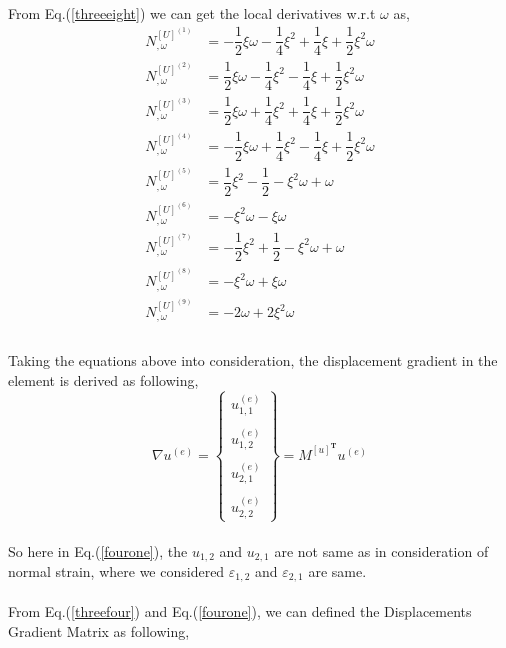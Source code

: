 \documentclass[12pt]{article}
\begin{document}
\\
From Eq.(\ref{threeeight}) we can get the local derivatives w.r.t  $\omega$ as,
\begin{equation}\label{fourty}
\begin{aligned}
N_{,\omega}^{[U]^{(1)}} &= -\dfrac{1}{2}\xi\omega-\dfrac{1}{4}\xi^2+\dfrac{1}{4}\xi+\dfrac{1}{2}\xi^2\omega \\
N_{,\omega}^{[U]^{(2)}} & = \dfrac{1}{2}\xi\omega-\dfrac{1}{4}\xi^2-\dfrac{1}{4}\xi+\dfrac{1}{2}\xi^2\omega \\
N_{,\omega}^{[U]^{(3)}} &= \dfrac{1}{2}\xi\omega+\dfrac{1}{4}\xi^2+\dfrac{1}{4}\xi+\dfrac{1}{2}\xi^2\omega \\
N_{,\omega}^{[U]^{(4)}} &= -\dfrac{1}{2}\xi\omega+\dfrac{1}{4}\xi^2-\dfrac{1}{4}\xi+\dfrac{1}{2}\xi^2\omega \\
N_{,\omega}^{[U]^{(5)}} &= \dfrac{1}{2}\xi^2-\dfrac{1}{2}-\xi^2\omega+\omega \\
N_{,\omega}^{[U]^{(6)}} &= -\xi^2\omega-\xi\omega \\
N_{,\omega}^{[U]^{(7)}} &=  -\dfrac{1}{2}\xi^2+\dfrac{1}{2}-\xi^2\omega+\omega \\
N_{,\omega}^{[U]^{(8)}} &= -\xi^2\omega+\xi\omega \\
N_{,\omega}^{[U]^{(9)}} &= -2\omega+2\xi^2\omega \\
\end{aligned}
\end{equation}
\\
Taking the equations above into consideration, the displacement gradient in the element is derived as following,
\begin{equation}\label{fourone}
\nabla u^{(e)}=
\begin{Bmatrix}
	u_{1,1}^{(e)} \\
	\\
	u_{1,2}^{(e)} \\
	\\
	u_{2,1}^{(e)} \\
	\\
	u_{2,2}^{(e)} 
\end{Bmatrix}
=M^{[u]^{\textbf{T}}}u^{(e)}
\end{equation}
\\
So here in Eq.(\ref{fourone}), the $u_{1,2}$ and $u_{2,1}$ are not same as in consideration of normal strain, where we considered $\varepsilon_{1,2}$ and $ \varepsilon_{2,1}$ are same.
\\
\\
From Eq.(\ref{threefour}) and Eq.(\ref{fourone}), we can defined the Displacements Gradient Matrix as following, 
\end{document}
